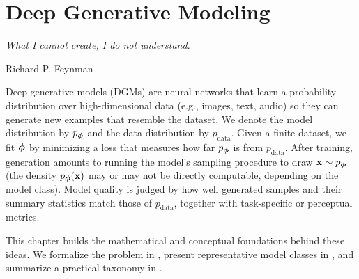 \chapter{Deep Generative Modeling}\label{ch:overview-dgm}

\epigraph{
    \textit{What I cannot create, I do not understand.}}{Richard P. Feynman}




Deep generative models (DGMs) are neural networks that learn a probability distribution over high-dimensional data (e.g., images, text, audio) so they can generate new examples that resemble the dataset. We denote the model distribution by $p_{{\bm{\phi}}}$ and the data distribution by $p_{\mathrm{data}}$. Given a finite dataset, we fit ${\bm{\phi}}$ by minimizing a loss that measures how far $p_{{\bm{\phi}}}$ is from $p_{\mathrm{data}}$. After training, generation amounts to running the model’s sampling procedure to draw ${\mathbf{x}} \sim p_{{\bm{\phi}}}$ (the density $p_{{\bm{\phi}}}({\mathbf{x}})$ may or may not be directly computable, depending on the model class). Model quality is judged by how well generated samples and their summary statistics match those of $p_{\mathrm{data}}$, together with task-specific or perceptual metrics.


This chapter builds the mathematical and conceptual foundations behind these ideas. We formalize the problem in , present representative model classes in , and summarize a practical taxonomy in .

